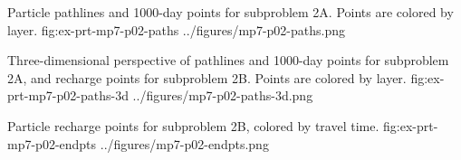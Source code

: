 \begin{StandardFigure}{
	Particle pathlines and 1000-day points for subproblem 2A. Points are colored by layer.
}
	{fig:ex-prt-mp7-p02-paths}
	{../figures/mp7-p02-paths.png}
\end{StandardFigure}

\begin{StandardFigure}{
	Three-dimensional perspective of pathlines and 1000-day points for subproblem 2A, and recharge points for subproblem 2B. Points are colored by layer.
}
	{fig:ex-prt-mp7-p02-paths-3d}
	{../figures/mp7-p02-paths-3d.png}
\end{StandardFigure}

\begin{StandardFigure}{
	Particle recharge points for subproblem 2B, colored by travel time.
}
	{fig:ex-prt-mp7-p02-endpts}
	{../figures/mp7-p02-endpts.png}
\end{StandardFigure}